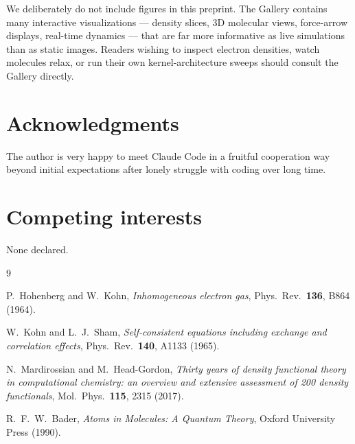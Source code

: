 \documentclass[11pt]{article}
\begin{document}
We deliberately do not include figures in this preprint. The Gallery contains many interactive visualizations --- density slices, 3D molecular views, force-arrow displays, real-time dynamics --- that are far more informative as live simulations than as static images. Readers wishing to inspect electron densities, watch molecules relax, or run their own kernel-architecture sweeps should consult the Gallery directly.

\section*{Acknowledgments}

The author is very happy to meet Claude Code in a fruitful cooperation way beyond initial expectations after lonely struggle with coding over long time.

\section*{Competing interests}

None declared.

\begin{thebibliography}{9}

P.~Hohenberg and W.~Kohn,
\emph{Inhomogeneous electron gas},
Phys.\ Rev.\ \textbf{136}, B864 (1964).

W.~Kohn and L.~J.~Sham,
\emph{Self-consistent equations including exchange and correlation effects},
Phys.\ Rev.\ \textbf{140}, A1133 (1965).

N.~Mardirossian and M.~Head-Gordon,
\emph{Thirty years of density functional theory in computational chemistry: an overview and extensive assessment of 200 density functionals},
Mol.\ Phys.\ \textbf{115}, 2315 (2017).

R.~F.~W.~Bader,
\emph{Atoms in Molecules: A Quantum Theory},
Oxford University Press (1990).

\end{thebibliography}
\end{document}
